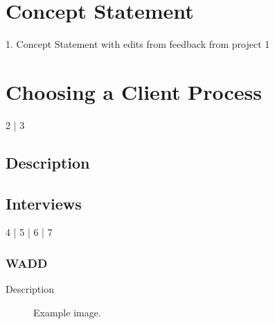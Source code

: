 \documentclass[12pt]{article} %
\begin{document}

\tableofcontents %

\newpage %


\section{Concept Statement} %

1. Concept Statement with edits from feedback from project 1


\section{Choosing a Client Process} %


2 | 3 


\subsection{Description} %

\subsection{Interviews} %

4 | 5 | 6 | 7

\subsubsection{WADD} %

Description

\begin{figure}[H] %
\caption{Example image.}
\label{fig:speciation}
\end{figure}
\end{document}
